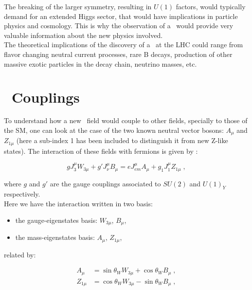 \noindent The breaking of the larger symmetry, resulting in $U(1)$ factors, would typically demand 
for an extended Higgs sector, that would have implications in particle physics
and cosmology. This is why the observation of a \Zprime~would provide very valuable
information about the new physics involved.\\

\noindent The theoretical implications of the discovery of a \Zprime~at the LHC could range 
from flavor changing neutral current processes, rare B decays, production of other 
massive exotic particles in the decay chain, neutrino masses, etc.\\

\section{\Zprime~Couplings}
\label{sec:ZprimeCoupling}

\noindent To understand how a new \Zprime~field would couple to other fields, specially
to those of the SM, one can look at the case of the two known  neutral vector 
bosons: $A_{\mu}$ and $Z_{1\mu}$ (here a sub-index 1 has been included 
to distinguish it from new Z-like states). The interaction of these 
fields with fermions is given by \cite{Langacker:2008yv}:

\begin{equation}
 g J_{3}^{\mu} W_{3\mu} + g\prime J_{\nu}^{\mu} B_{\mu} = e J_{em}^{\mu} A_{\mu} + g_{1} J_{1}^{\mu} Z_{1\mu} \; ,
\end{equation}

\noindent where $g$ and $g\prime$ are the gauge couplings associated
to $SU(2)$ and $U(1)_{Y}$ respectively. \\

\noindent Here we have the interaction written in two basis:
\begin{itemize}
 \item the gauge-eigenstates basis: $W_{3\mu}$, $B_{\mu}$,
 \item the mass-eigenstates basis: $A_{\mu}$, $Z_{1\mu}$,
\end{itemize}
\noindent related by:

\begin{equation}
\begin{split}
 A_{\mu} &= \sin \theta_{W} W_{3\mu} + \cos \theta_{W} B_{\mu} \; , \\
 Z_{1\mu} &= \cos \theta_{W} W_{3\mu} - \sin \theta_{W} B_{\mu} \; ,
\end{split}
\end{equation}

